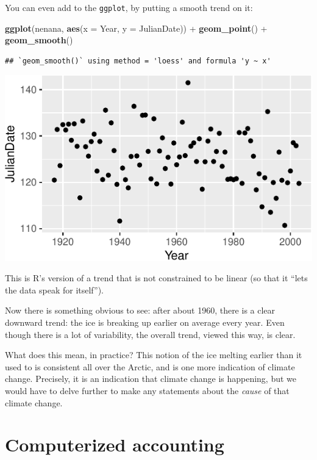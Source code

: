 \documentclass[]{tufte-book}
\newenvironment{Shaded}{}{}
\newcommand{\DataTypeTok}[1]{\textcolor[rgb]{0.56,0.13,0.00}{#1}}
\newcommand{\KeywordTok}[1]{\textcolor[rgb]{0.00,0.44,0.13}{\textbf{#1}}}
\newcommand{\NormalTok}[1]{#1}
\newcommand{\OperatorTok}[1]{\textcolor[rgb]{0.40,0.40,0.40}{#1}}
\newcommand{\StringTok}[1]{\textcolor[rgb]{0.25,0.44,0.63}{#1}}
\theoremstyle{definition}
\theoremstyle{definition}
\theoremstyle{definition}
\theoremstyle{remark}
\begin{document}
You can even add to the \texttt{ggplot}, by putting a smooth trend on
it:

\begin{Shaded}
\begin{Highlighting}[]
\KeywordTok{ggplot}\NormalTok{(nenana, }\KeywordTok{aes}\NormalTok{(}\DataTypeTok{x =}\NormalTok{ Year, }\DataTypeTok{y =}\NormalTok{ JulianDate)) }\OperatorTok{+}\StringTok{ }
\StringTok{    }\KeywordTok{geom_point}\NormalTok{() }\OperatorTok{+}\StringTok{ }\KeywordTok{geom_smooth}\NormalTok{()}
\end{Highlighting}
\end{Shaded}

\begin{verbatim}
## `geom_smooth()` using method = 'loess' and formula 'y ~ x'
\end{verbatim}

\includegraphics{03-data-summaries_files/figure-latex/unnamed-chunk-39-1}

This is R's version of a trend that is not constrained to be linear (so
that it ``lets the data speak for itself'').

Now there is something obvious to see: after about 1960, there is a
clear downward trend: the ice is breaking up earlier on average every
year. Even though there is a lot of variability, the overall trend,
viewed this way, is clear.

What does this mean, in practice? This notion of the ice melting earlier
than it used to is consistent all over the Arctic, and is one more
indication of climate change. Precisely, it is an indication that
climate change is happening, but we would have to delve further to make
any statements about the \emph{cause} of that climate change.

\hypertarget{computerized-accounting}{%
\section{Computerized accounting}\label{computerized-accounting}}
\end{document}
